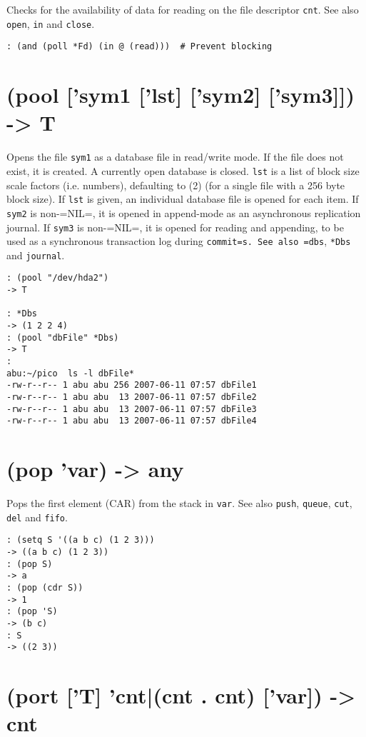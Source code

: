 {{{{{{{Checks for the availability of data for reading on the file descriptor
\texttt{cnt}. See also \texttt{open}, \texttt{in} and \texttt{close}.


\begin{verbatim}
: (and (poll *Fd) (in @ (read)))  # Prevent blocking
\end{verbatim}

 
\section{(pool ['sym1 ['lst] ['sym2] ['sym3]]) -> T}
\label{sec-8-1-16-21}


Opens the file \texttt{sym1} as a database file in read/write mode. If the file
does not exist, it is created. A currently open database is closed.
\texttt{lst} is a list of block size scale factors (i.e. numbers), defaulting
to (2) (for a single file with a 256 byte block size). If \texttt{lst} is
given, an individual database file is opened for each item. If \texttt{sym2} is
non-=NIL=, it is opened in append-mode as an asynchronous replication
journal. If \texttt{sym3} is non-=NIL=, it is opened for reading and appending,
to be used as a synchronous transaction log during \texttt{commit=s. See also =dbs}, \texttt{*Dbs} and \texttt{journal}.


\begin{verbatim}
: (pool "/dev/hda2")
-> T

: *Dbs
-> (1 2 2 4)
: (pool "dbFile" *Dbs)
-> T
:
abu:~/pico  ls -l dbFile*
-rw-r--r-- 1 abu abu 256 2007-06-11 07:57 dbFile1
-rw-r--r-- 1 abu abu  13 2007-06-11 07:57 dbFile2
-rw-r--r-- 1 abu abu  13 2007-06-11 07:57 dbFile3
-rw-r--r-- 1 abu abu  13 2007-06-11 07:57 dbFile4
\end{verbatim}

 
\section{(pop 'var) -> any}
\label{sec-8-1-16-22}


Pops the first element (CAR) from the stack in \texttt{var}. See also \texttt{push},
\texttt{queue}, \texttt{cut}, \texttt{del} and \texttt{fifo}.


\begin{verbatim}
: (setq S '((a b c) (1 2 3)))
-> ((a b c) (1 2 3))
: (pop S)
-> a
: (pop (cdr S))
-> 1
: (pop 'S)
-> (b c)
: S
-> ((2 3))
\end{verbatim}

 
\section{(port ['T] 'cnt|(cnt . cnt) ['var]) -> cnt}
\label{sec-8-1-16-23}


}}}}}}}
